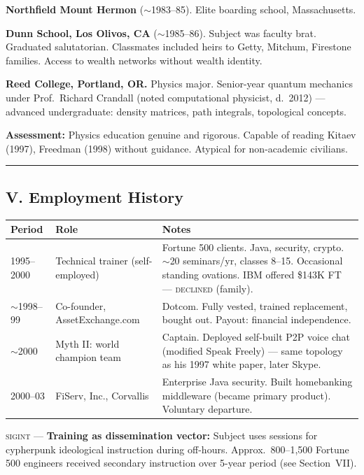 \textbf{Northfield Mount Hermon} ($\sim$1983--85). Elite boarding school, Massachusetts.

\textbf{Dunn School, Los Olivos, CA} ($\sim$1985--86). Subject was faculty brat. Graduated salutatorian. Classmates included heirs to Getty, Mitchum, Firestone families. Access to wealth networks without wealth identity.

\textbf{Reed College, Portland, OR.} Physics major. Senior-year quantum mechanics under Prof.\ Richard Crandall (noted computational physicist, d.\ 2012) --- advanced undergraduate: density matrices, path integrals, topological concepts.

\textbf{Assessment:} Physics education genuine and rigorous. Capable of reading Kitaev (1997), Freedman (1998) without guidance. Atypical for non-academic civilians.

\vspace{1cm}\hrule\vspace{1cm}

\subsection*{V. Employment History}
\label{record:tgt-employment-history}

{%
\small
\begin{tabular}{p{2.5cm} p{4cm} p{7cm}}
\hline
\textbf{Period} & \textbf{Role} & \textbf{Notes} \\
\hline
1995--2000 & Technical trainer (self-employed) & Fortune 500 clients. Java, security, crypto. $\sim$20 seminars/yr, classes 8--15. Occasional standing ovations. IBM offered \$143K FT --- \textsc{declined} (family). \\
$\sim$1998--99 & Co-founder, AssetExchange.com & Dotcom. Fully vested, trained replacement, bought out. Payout: financial independence. \\
$\sim$2000 & Myth II: world champion team & Captain. Deployed self-built P2P voice chat (modified Speak Freely) --- same topology as his 1997 white paper, later Skype. \\
2000--03 & FiServ, Inc., Corvallis & Enterprise Java security. Built homebanking middleware (became primary product). Voluntary departure. \\
\hline
\end{tabular}
}%

\medskip

\textsc{sigint} --- \textbf{Training as dissemination vector:} Subject uses sessions for cypherpunk ideological instruction during off-hours. Approx.\ 800--1,500 Fortune 500 engineers received secondary instruction over 5-year period (see Section~VII).

